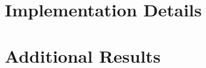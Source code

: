 \section{Implementation Details}
\label{app:impl}

\section{Additional Results}
\label{app:results}
